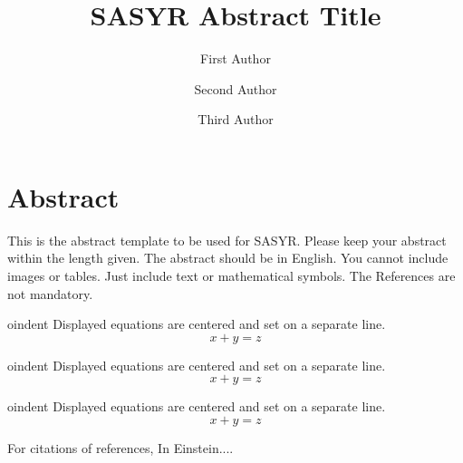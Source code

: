 \documentclass[runningheads]{llncs}
\begin{document}
%
\title{SASYR Abstract Title}
%
%
\author{First Author \and
Second Author \and
Third Author}
%
%
%
\maketitle              %
%
%
%
\section*{Abstract}
This is the abstract template to be used for SASYR. Please keep your abstract within the length given. The abstract should be in English. You cannot include images or tables. Just include text or mathematical symbols. The References are not mandatory.

\lipsum[1-1]


oindent Displayed equations are centered and set on a separate
line.
\begin{equation}
x + y = z
\end{equation}



oindent Displayed equations are centered and set on a separate
line.
\begin{equation}
x + y = z
\end{equation}




oindent Displayed equations are centered and set on a separate
line.
\begin{equation}
x + y = z
\end{equation}


%

For citations of references,
In \cite{einstein} Einstein....


%
%
%


%
\end{document}
